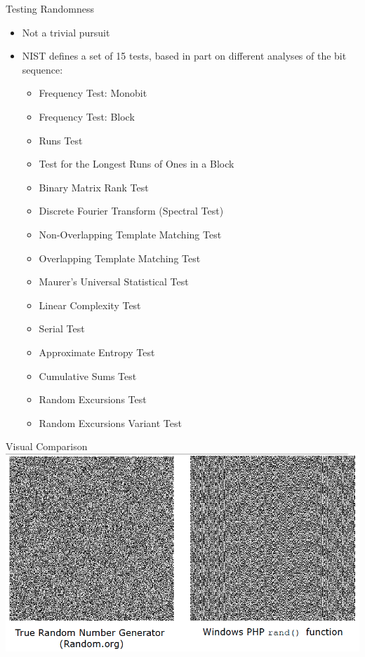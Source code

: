 \documentclass[xcolor=x11names,compress]{beamer}
\renewcommand{\(}{\begin{columns}}
\renewcommand{\)}{\end{columns}}
\newcommand{\<}[1]{\begin{column}{#1}}
\renewcommand{\>}{\end{column}}
\begin{document}
\begin{frame}{Testing Randomness}
\begin{itemize}
\item Not a trivial pursuit
\item NIST defines a set of 15 tests, based in part on different analyses of the bit sequence:
\begin{itemize}
\item Frequency Test: Monobit
\item Frequency Test: Block
\item Runs Test
\item Test for the Longest Runs of Ones in a Block
\item Binary Matrix Rank Test
\item Discrete Fourier Transform (Spectral Test)
\item Non-Overlapping Template Matching Test
\item Overlapping Template Matching Test
\item Maurer's Universal Statistical Test
\item Linear Complexity Test
\item Serial Test
\item Approximate Entropy Test
\item Cumulative Sums Test
\item Random Excursions Test
\item Random Excursions Variant Test
\end{itemize}  	
\end{itemize}  	
\end{frame}

\begin{frame}{Visual Comparison}
\includegraphics[scale=0.4]{../figs/rng1}
\end{frame}
\end{document}
